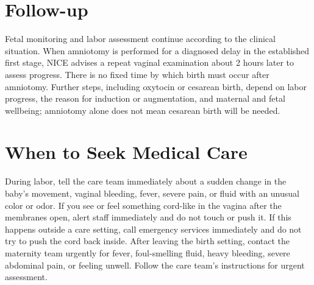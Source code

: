 \section*{Follow-up}
Fetal monitoring and labor assessment continue according to the clinical situation. When amniotomy is performed for a diagnosed delay in the established first stage, NICE advises a repeat vaginal examination about 2 hours later to assess progress. There is no fixed time by which birth must occur after amniotomy. Further steps, including oxytocin or cesarean birth, depend on labor progress, the reason for induction or augmentation, and maternal and fetal wellbeing; amniotomy alone does not mean cesarean birth will be needed.

\section*{When to Seek Medical Care}
During labor, tell the care team immediately about a sudden change in the baby's movement, vaginal bleeding, fever, severe pain, or fluid with an unusual color or odor. If you see or feel something cord-like in the vagina after the membranes open, alert staff immediately and do not touch or push it. If this happens outside a care setting, call emergency services immediately and do not try to push the cord back inside. After leaving the birth setting, contact the maternity team urgently for fever, foul-smelling fluid, heavy bleeding, severe abdominal pain, or feeling unwell. Follow the care team's instructions for urgent assessment.

